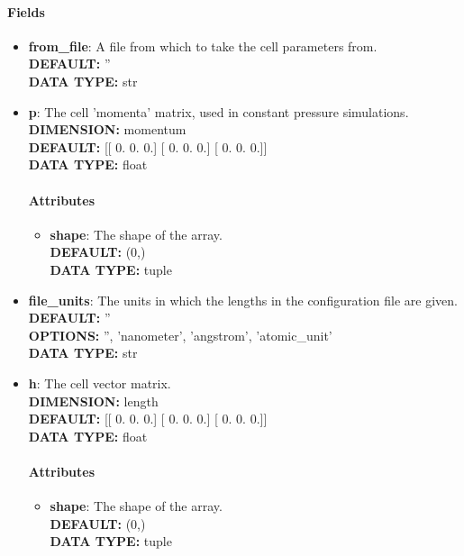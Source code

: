\paragraph{Fields}
 \begin{itemize}
\item {\bf from\_file}:
 A file from which to take the cell parameters from.
{\\ \bf DEFAULT: }''
{\\ \bf DATA TYPE: }str
\item {\bf p}:
 The cell 'momenta' matrix, used in constant pressure simulations.
{\\ \bf DIMENSION: }momentum
{\\ \bf DEFAULT: }
      [[ 0.  0.  0.]
       [ 0.  0.  0.]
       [ 0.  0.  0.]]
{\\ \bf DATA TYPE: }float
\paragraph{Attributes}
 \begin{itemize}
\item {\bf shape}:
 The shape of the array.
{\\ \bf DEFAULT: }(0,)
{\\ \bf DATA TYPE: }tuple
\end{itemize}
 
\item {\bf file\_units}:
 The units in which the lengths in the configuration file are given.
{\\ \bf DEFAULT: }''
{\\ \bf OPTIONS: }'', 'nanometer', 'angstrom', 'atomic\_unit'
{\\ \bf DATA TYPE: }str
\item {\bf h}:
 The cell vector matrix.
{\\ \bf DIMENSION: }length
{\\ \bf DEFAULT: }
      [[ 0.  0.  0.]
       [ 0.  0.  0.]
       [ 0.  0.  0.]]
{\\ \bf DATA TYPE: }float
\paragraph{Attributes}
 \begin{itemize}
\item {\bf shape}:
 The shape of the array.
{\\ \bf DEFAULT: }(0,)
{\\ \bf DATA TYPE: }tuple
\end{itemize}
 

\end{itemize}
